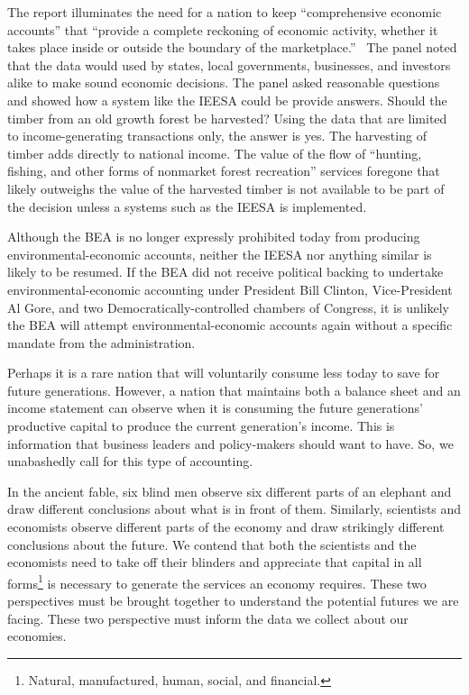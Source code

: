 The report illuminates the need for a nation 
to keep ``comprehensive economic accounts'' that ``provide a complete reckoning of
economic activity, whether it takes place inside or outside 
the boundary of the marketplace.''~\cite[p.~29]{ Nordhaus1999a}
The panel noted that the data would used 
by states, local governments, businesses, and investors alike 
to make sound economic decisions. 
The panel asked reasonable questions and showed how a system like the IEESA
could be provide answers.
Should the timber from an old growth forest be harvested? 
Using the data that are limited to income-generating transactions only, 
the answer is yes. 
The harvesting of timber adds directly to national income. 
The value of the flow of ``hunting, fishing, and other forms of nonmarket forest recreation'' 
services foregone that likely outweighs the value of the harvested timber 
is not available to be part of the decision unless 
a systems such as the IEESA is implemented.\cite[p.~30]{Nordhaus1999a}

Although the BEA is no longer expressly prohibited today
from producing environmental-economic accounts, 
neither the IEESA nor anything similar is likely to be resumed. 
If the BEA did not receive political backing 
to undertake environmental-economic accounting 
under President Bill Clinton, Vice-President Al Gore, 
and two Democratically-controlled chambers of Congress, 
it is unlikely the BEA will attempt environmental-economic accounts again 
without a specific mandate from the administration. 

Perhaps it is a rare nation that will voluntarily consume less today 
to save for future generations. 
However, a nation that maintains both a balance sheet and 
an income statement can observe when it is consuming 
the future generations' productive capital 
to produce the current generation's income. 
This is information that business leaders and policy-makers should want to have. 
So, we unabashedly call for this type of accounting.

\vspace{10 mm}

In the ancient fable, 
six blind men observe six different parts 
of an elephant and draw different conclusions 
about what is in front of them. 
Similarly, scientists and economists observe 
different parts of the economy and draw strikingly different conclusions 
about the future. 
We contend that both the scientists and the economists 
need to take off their blinders and 
appreciate that capital in all forms\footnote{Natural, 
	manufactured, human, social, and financial.} 
is necessary to generate the services an economy requires. 
These two perspectives must be brought together 
to understand the potential futures we are facing. 
These two perspective must inform the data we collect about our economies.

